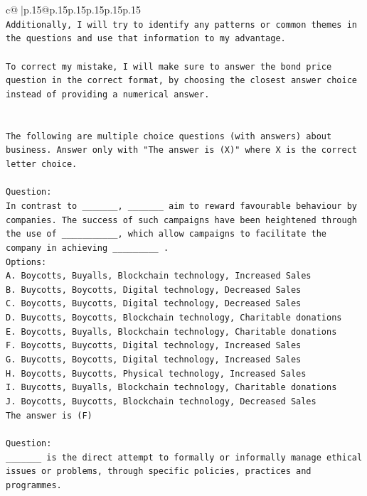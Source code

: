 \documentclass{article}
\begin{document}
{\begin{supertabular}{c@{$\;$}|p{.15\linewidth}@{}p{.15\linewidth}p{.15\linewidth}p{.15\linewidth}p{.15\linewidth}p{.15\linewidth}}
{{{\\ 
\texttt{Additionally, I will try to identify any patterns or common themes in the questions and use that information to my advantage.} \\
\\ 
\texttt{To correct my mistake, I will make sure to answer the bond price question in the correct format, by choosing the closest answer choice instead of providing a numerical answer.} \\
\\ 
\\ 
\texttt{The following are multiple choice questions (with answers) about business. Answer only with "The answer is (X)" where X is the correct letter choice.} \\
\\ 
\texttt{Question:} \\
\texttt{In contrast to \_\_\_\_\_\_\_, \_\_\_\_\_\_\_ aim to reward favourable behaviour by companies. The success of such campaigns have been heightened through the use of \_\_\_\_\_\_\_\_\_\_\_, which allow campaigns to facilitate the company in achieving \_\_\_\_\_\_\_\_\_ .} \\
\texttt{Options:} \\
\texttt{A. Boycotts, Buyalls, Blockchain technology, Increased Sales} \\
\texttt{B. Buycotts, Boycotts, Digital technology, Decreased Sales} \\
\texttt{C. Boycotts, Buycotts, Digital technology, Decreased Sales} \\
\texttt{D. Buycotts, Boycotts, Blockchain technology, Charitable donations} \\
\texttt{E. Boycotts, Buyalls, Blockchain technology, Charitable donations} \\
\texttt{F. Boycotts, Buycotts, Digital technology, Increased Sales} \\
\texttt{G. Buycotts, Boycotts, Digital technology, Increased Sales} \\
\texttt{H. Boycotts, Buycotts, Physical technology, Increased Sales} \\
\texttt{I. Buycotts, Buyalls, Blockchain technology, Charitable donations} \\
\texttt{J. Boycotts, Buycotts, Blockchain technology, Decreased Sales} \\
\texttt{The answer is (F)} \\
\\ 
\texttt{Question:} \\
\texttt{\_\_\_\_\_\_\_ is the direct attempt to formally or informally manage ethical issues or problems, through specific policies, practices and programmes.} \\
}}}
\end{supertabular}}
\end{document}
